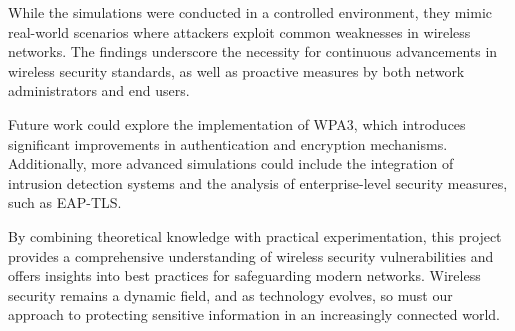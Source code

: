 While the simulations were conducted in a controlled environment, they mimic real-world scenarios where attackers exploit common weaknesses in wireless networks. The findings underscore the necessity for continuous advancements in wireless security standards, as well as proactive measures by both network administrators and end users.

Future work could explore the implementation of WPA3, which introduces significant improvements in authentication and encryption mechanisms. Additionally, more advanced simulations could include the integration of intrusion detection systems and the analysis of enterprise-level security measures, such as EAP-TLS.

By combining theoretical knowledge with practical experimentation, this project provides a comprehensive understanding of wireless security vulnerabilities and offers insights into best practices for safeguarding modern networks. Wireless security remains a dynamic field, and as technology evolves, so must our approach to protecting sensitive information in an increasingly connected world.
